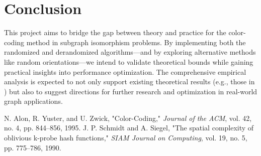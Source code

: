 \section{Conclusion}
This project aims to bridge the gap between theory and practice for the color-coding method in subgraph isomorphism problems. By implementing both the randomized and derandomized algorithms—and by exploring alternative methods like random orientations—we intend to validate theoretical bounds while gaining practical insights into performance optimization. The comprehensive empirical analysis is expected to not only support existing theoretical results (e.g., those in \cite{alon1995color}) but also to suggest directions for further research and optimization in real-world graph applications.


\begin{thebibliography}{9}
     N. Alon, R. Yuster, and U. Zwick, "Color-Coding," \textit{Journal of the ACM}, vol. 42, no. 4, pp. 844–856, 1995.
     J. P. Schmidt and A. Siegel, "The spatial complexity of oblivious k-probe hash functions," \textit{SIAM Journal on Computing}, vol. 19, no. 5, pp. 775–786, 1990.
\end{thebibliography}




